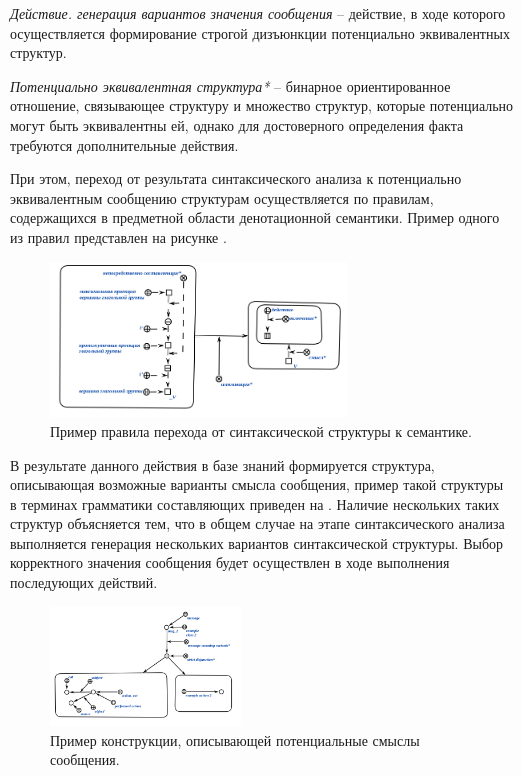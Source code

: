 \textit{Действие. генерация вариантов значения сообщения} -- действие, в ходе которого осуществляется формирование строгой дизъюнкции потенциально эквивалентных структур.

\textit{Потенциально эквивалентная структура*} -- бинарное ориентированное отношение, связывающее структуру и множество структур, которые потенциально могут быть эквивалентны ей, однако для достоверного определения факта требуются дополнительные действия.

При этом, переход от результата синтаксического анализа к потенциально эквивалентным сообщению структурам осуществляется по правилам, содержащихся в предметной области денотационной семантики. Пример одного из правил представлен на рисунке \textit{}.

\begin{figure}[h]
    \centering
    \includegraphics[width=0.7\textwidth]{images/part4/chapter_nl_interfaces/d_sem_3.png}
    \caption{Пример правила перехода от синтаксической структуры к семантике.}
    \label{fig:transition_to_semanic_rule}
\end{figure}

В результате данного действия в базе знаний формируется структура, описывающая возможные варианты смысла сообщения, пример такой структуры в терминах грамматики составляющих приведен на \textit{}. Наличие нескольких таких структур объясняется тем, что в общем случае на этапе синтаксического анализа выполняется генерация нескольких вариантов синтаксической структуры. Выбор корректного значения сообщения будет осуществлен в ходе выполнения последующих действий.

\begin{figure}[h]
    \centering
    \includegraphics[width=0.45\textwidth]{images/part4/chapter_nl_interfaces/messsage_meaning_variants.png}
    \caption{Пример конструкции, описывающей потенциальные смыслы сообщения.}
    \label{fig:messsage_meaning_variants}
\end{figure}

